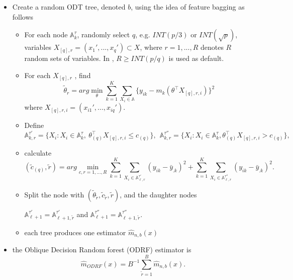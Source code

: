 \documentclass[nojss]{jss}
\numberwithin{equation}{section}
\begin{document}
\begin{itemize}

\item Create a random ODT tree, denoted $ b$, using the idea of feature bagging as follows

  \begin{itemize}

  \item For each node $\mathbb{A}_k^\tau$, randomly select $q$, e.g. $INT(p/3)$ or $ INT(\sqrt{p}) $, variables $  X_{[q], r} = (x_1', ..., x_q') \subset X $, where $ r = 1, ..., R $ denotes $R$ random sets of variables.   In , $R \ge INT(p/q)$ is used as default.

  \item For each $  X_{[q], r} $ , find
  $$ \tilde \theta_{r} = arg \min_{\theta} \sum_{k=1}^K \sum_{X_i \in \mathbb{A}} \Big\{y_{ik} - m_k(\theta^\top X_{[q],r, i})\Big\}^2
  $$
  where $ X_{[q],r, i} = (x_{i1}', ..., x_{iq}') $.
\item Define
  $$
    \mathbb{A}_{k,r}^{\tau'} = \{ X_i: X_i \in \mathbb{A}_k^\tau, \  \theta_{(q)}^\top X_{[q],r, i} \le c_{(q)}\}, \ \
    \mathbb{A}_{k,r}^{\tau''} = \{ X_i: X_i \in \mathbb{A}_k^\tau, \theta_{(q)}^\top X_{[q],r, i} > c_{(q)}\},
  $$
 \item  calculate
   $$
     (\tilde c_{(q)}, \tilde r) =arg  \min_{c, r=1,..., R} \sum_{k=1}^K \sum_{X_i \in \mathbb{A}_{\ell,r}^{\tau'}} (y_{ik} - \bar y_{.k})^2  + \sum_{k=1}^K \sum_{X_i \in \mathbb{A}_{\ell, r}^{\tau''}} (y_{ik} - \bar y_{.k})^2.
   $$
 \item Split the node with $ (\tilde \theta_{\tilde r}, \tilde c_{\tilde r}, \tilde r) $, and the daughter nodes
\begin{center}
 $\mathbb{A}_{\ell+1}^{\tau'} = \mathbb{A}_{\ell+1,\tilde r}^{\tau'}$ and $\mathbb{A}_{\ell+1}^{\tau''} = \mathbb{A}_{\ell+1,\tilde r}^{\tau''}$.
\end{center}


  \item each tree produces one estimator $ \hat m_{n, b} (x) $

\end{itemize}
   \item  the Oblique Decision Random forest (ODRF) estimator is $$
    \hat m_{ODRF}(x) = B^{-1} \sum_{\tilde r=1}^B \hat m_{n, b} (x).
  $$
\end{itemize}
\end{document}
